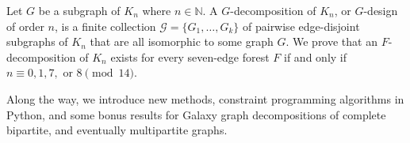 
Let $G$ be a subgraph of $K_n$ where $n \in \mathbb{N}$. A $G$-decomposition of $K_n$, or $G$-design of order $n$, is a finite collection $\mathcal{G} = \{G_1, \ldots, G_k\}$ of pairwise edge-disjoint subgraphs of $K_n$ that are all isomorphic to some graph $G$. We prove that an $F$-decomposition of $K_n$ exists for every seven-edge forest $F$ if and only if $n \equiv 0,1,7, \text{ or } 8 \pmod{14}$.

Along the way, we introduce new methods, constraint programming algorithms in Python, and some bonus results for Galaxy graph decompositions of complete bipartite, and eventually multipartite graphs.

